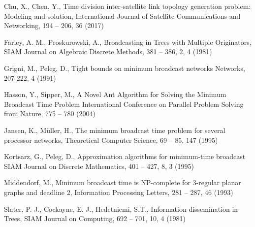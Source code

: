 \begin{thebibliography}{}
%
%
Chu, X., Chen, Y.,
Time division inter‐satellite link topology generation problem: Modeling and solution,
International Journal of Satellite Communications and Networking, 194 -- 206, 36 (2017)

Farley, A. M., Proskurowski, A.,
Broadcasting in Trees with Multiple Originators,
SIAM Journal on Algebraic Discrete Methods, 381 -- 386, 2, 4 (1981)

Grigni, M., Peleg, D.,
Tight bounds on minimum broadcast networks
Networks, 207-222, 4 (1991)

Hasson, Y., Sipper, M.,
A Novel Ant Algorithm for Solving the Minimum Broadcast Time Problem
International Conference on Parallel Problem Solving from Nature, 775 -- 780 (2004)

Jansen, K., M\"uller, H.,
The minimum broadcast time problem for several processor networks, 
Theoretical Computer Science, 69 -- 85, 147 (1995)

Kortsarz, G., Peleg, D.,
Approximation algorithms for minimum-time broadcast
SIAM Journal on Discrete Mathematics, 401 -- 427, 8, 3 (1995)

Middendorf, M.,
Minimum broadcast time is NP-complete for 3-regular planar graphs and deadline 2,
Information Processing Letters, 281 -- 287, 46 (1993)

Slater, P. J., Cockayne, E. J., Hedetniemi, S.T.,
Information dissemination in Trees,
SIAM Journal on Computing, 692 -- 701, 10, 4 (1981)

\end{thebibliography}



